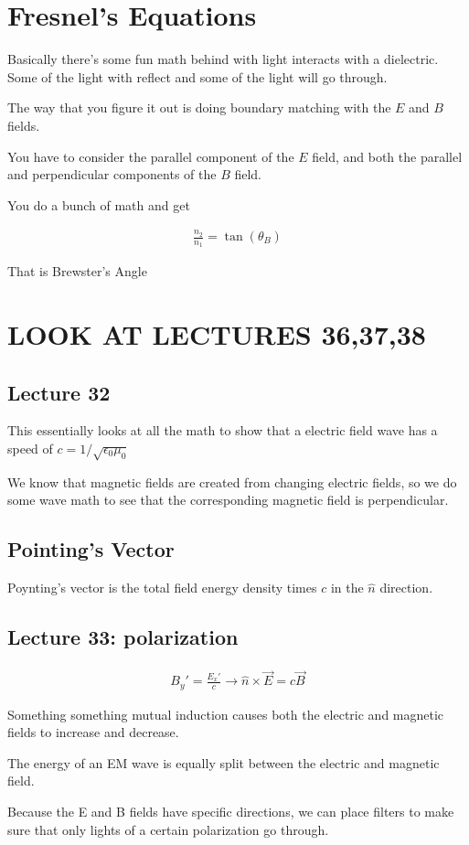 \documentclass[fleqn]{report}
\newcommand{\equations} [1] {
\begin{gather*}
#1
\end{gather*}
}
\begin{document}
\section{Fresnel's Equations}
Basically there's some fun math behind with light interacts with a 
dielectric. Some of the light with reflect and some of the light will go through.

The way that you figure it out is doing boundary matching with the $E$ and $B$ 
fields. 

You have to consider the parallel component of the $E$ field,
and both the parallel and perpendicular components of the $B$ field.

You do a bunch of math and get 
\equations{
    \frac{n_2}{n_1} = \tan(\theta_B)
}
That is Brewster's Angle 

\section{LOOK AT LECTURES 36,37,38}

\subsection{Lecture 32}
This essentially looks at all the math to show that a electric field wave 
has a speed of $c = 1 / \sqrt{\epsilon_0 \mu_0}$

We know that magnetic fields are created from changing electric fields, so 
we do some wave math to see that the corresponding magnetic field is 
perpendicular. 

\subsection{Pointing's Vector}
Poynting's vector is the total field energy density times $c$ in the $\hat n$ 
direction. 

\subsection{Lecture 33: polarization}
\equations{
    B_y' = \frac{E_x'}{c}
    \rightarrow 
    \hat n \times \vec E 
    =
    c \vec B 
}
Something something mutual induction causes both the electric and magnetic fields 
to increase and decrease. 

The energy of an EM wave is equally split between the electric and 
magnetic field. 

Because the E and B fields have specific directions, we can place filters 
to make sure that only lights of a certain polarization go through. 
\end{document}
